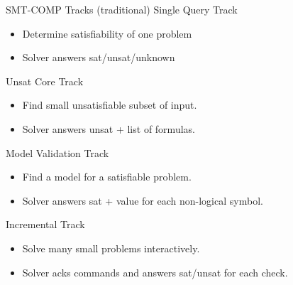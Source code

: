 \documentclass[table]{beamer}
\def\emph#1{\textcolor{MYblue}{#1}}
\begin{document}
\begin{frame}[fragile]{SMT-COMP Tracks (traditional)}
  \emph{Single Query Track}
  \begin{itemize}
  \item Determine satisfiability of one problem
  \item Solver answers sat/unsat/unknown
  \end{itemize}
  \medskip

  \emph{Unsat Core Track}
  \begin{itemize}
  \item Find small unsatisfiable subset of input.
  \item Solver answers unsat + list of formulas.
  \end{itemize}
  \medskip

  \emph{Model Validation Track}
  \begin{itemize}
  \item Find a model for a satisfiable problem.
  \item Solver answers sat + value for each non-logical symbol.
  \end{itemize}
  \medskip

  \emph{Incremental Track}
  \begin{itemize}
  \item Solve many small problems interactively.
  \item Solver acks commands and answers sat/unsat for each check.
  \end{itemize}
\end{frame}
\end{document}
